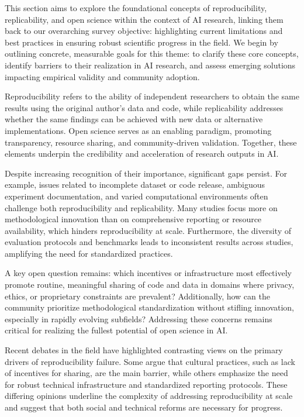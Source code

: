 \documentclass[sigconf]{acmart}
\begin{document}
This section aims to explore the foundational concepts of reproducibility, replicability, and open science within the context of AI research, linking them back to our overarching survey objective: highlighting current limitations and best practices in ensuring robust scientific progress in the field. We begin by outlining concrete, measurable goals for this theme: to clarify these core concepts, identify barriers to their realization in AI research, and assess emerging solutions impacting empirical validity and community adoption.

Reproducibility refers to the ability of independent researchers to obtain the same results using the original author's data and code, while replicability addresses whether the same findings can be achieved with new data or alternative implementations. Open science serves as an enabling paradigm, promoting transparency, resource sharing, and community-driven validation. Together, these elements underpin the credibility and acceleration of research outputs in AI.

Despite increasing recognition of their importance, significant gaps persist. For example, issues related to incomplete dataset or code release, ambiguous experiment documentation, and varied computational environments often challenge both reproducibility and replicability. Many studies focus more on methodological innovation than on comprehensive reporting or resource availability, which hinders reproducibility at scale. Furthermore, the diversity of evaluation protocols and benchmarks leads to inconsistent results across studies, amplifying the need for standardized practices.

A key open question remains: which incentives or infrastructure most effectively promote routine, meaningful sharing of code and data in domains where privacy, ethics, or proprietary constraints are prevalent? Additionally, how can the community prioritize methodological standardization without stifling innovation, especially in rapidly evolving subfields? Addressing these concerns remains critical for realizing the fullest potential of open science in AI.

Recent debates in the field have highlighted contrasting views on the primary drivers of reproducibility failure. Some argue that cultural practices, such as lack of incentives for sharing, are the main barrier, while others emphasize the need for robust technical infrastructure and standardized reporting protocols. These differing opinions underline the complexity of addressing reproducibility at scale and suggest that both social and technical reforms are necessary for progress.
\end{document}
